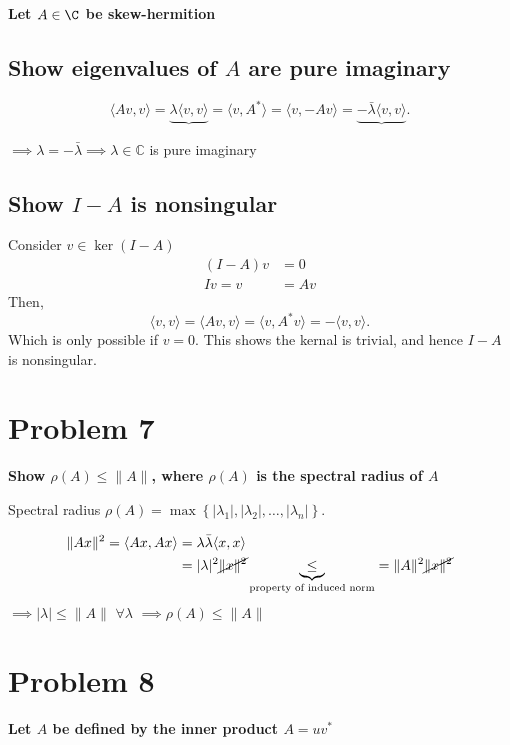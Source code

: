 \textbf{Let $A\in\C$ be skew-hermition} 

\subsection{Show eigenvalues of $A$ are pure imaginary}%
\label{sub:6.1}

\[
\langle Av,v\rangle = \underbrace{\lambda \langle
  v,v\rangle} = \langle
  v, A^*\rangle = \langle v, -Av\rangle = \underbrace{-\bar\lambda \langle v,
  v\rangle}
.\] 

$ \implies \lambda = -\bar \lambda \implies \lambda\in\mathbb{C}$ is pure
imaginary

 \subsection{Show $I-A$ is nonsingular}%
\label{sub:6.2}
Consider $v\in \ker(I-A)$
\begin{align*}
  (I-A)v&=0 \\
  Iv =v &=Av 
\end{align*}
Then,
\[
\langle v,v\rangle = \langle Av, v\rangle = \langle v, A^*v\rangle
= -\langle v,v\rangle
.\] 
Which is only possible if $v=0$. This shows the kernal is trivial,
and hence $I-A$ is nonsingular.


\section{Problem 7}%
\label{sec:problem_7}
\textbf{Show $ \rho (A) \leq \|A\|$, where $\rho (A)$ is the spectral radius of $A$} 

  Spectral radius $\rho (A) =\max{\left\{|
    \lambda_1|,|\lambda_2|, \dots, |\lambda_n|\right\}}$.

    \begin{align*}
      \|Ax\|^2 = \langle Ax,Ax\rangle &= \lambda\bar \lambda \langle x,
      x\rangle \\
      &= | \lambda|^2 \cancel{\|x\|^2} \underbrace{\leq}_{\text{property of
      induced norm}} = \|A\|^2\cancel{\|x\|^2}
    \end{align*}
$\implies |\lambda| \leq \|A\|$  $\forall \lambda$ $\implies \rho(A) \leq
\|A\|$


\section{Problem 8}%
\label{sec:problem_8}

\textbf{Let $A$ be defined by the inner product $A = uv^{*}$} 

